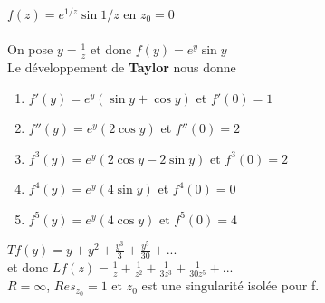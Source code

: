 \begin{myExample}
	$f(z)=e^{1/z}\sin 1/z$ en $z_{0}=0$
	\\\\
	On pose $y=\frac{1}{z}$ et donc $f(y)=e^y\sin y$
	\\
	Le développement de {\bf Taylor} nous donne 
	\begin{enumerate}
		\item
		$f'(y)=e^y(\sin y+\cos y)$  et  $f'(0)=1$
		\item
		$f''(y)=e^y(2\cos y)$ et $f''(0)=2$
		\item
		$f^3(y)=e^y(2\cos y - 2\sin y)$ et $f^3(0)=2$
		\item
		$f^4(y)=e^y(4\sin y)$ et $f^4(0)=0$
		\item
		$f^5(y)=e^y(4\cos y)$ et $f^5(0)=4$
	\end{enumerate}
	
	$Tf(y)=y+y^2+\frac{y^3}{3}+\frac{y^5}{30}+...$
	\\et donc
	$Lf(z)=\frac{1}{z}+\frac{1}{z^2}+\frac{1}{3z^3}+\frac{1}{30z^5}+...$
	\\
	$R=\infty$, $Res_{z_{0}}=1$ et $z_{0}$ est une singularité isolée pour f.
\end{myExample}